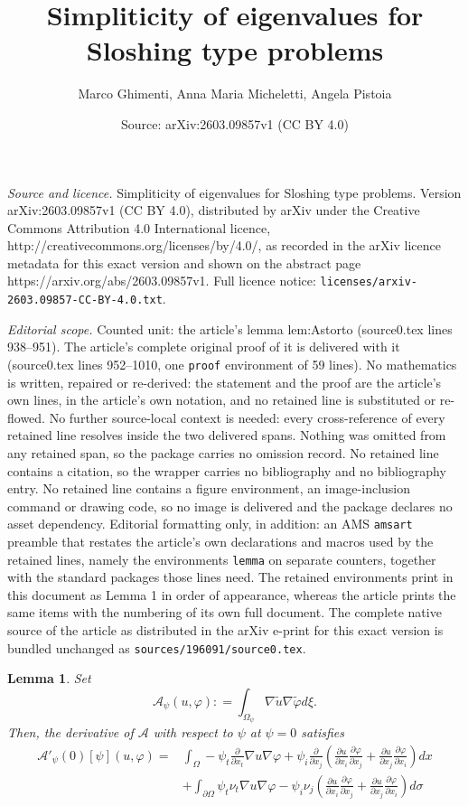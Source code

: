 \documentclass[10pt,a4paper]{amsart}
\title{Simpliticity of eigenvalues for Sloshing type problems}
\author{Marco Ghimenti, Anna Maria Micheletti, Angela Pistoia}
\date{Source: arXiv:2603.09857v1 (CC BY 4.0)}
\newtheorem{lemma}{Lemma}
\begin{document}
\maketitle

\noindent\emph{Source and licence.} Simpliticity of eigenvalues for Sloshing type problems. Version arXiv:2603.09857v1 (CC BY 4.0), distributed by arXiv under the Creative Commons Attribution 4.0 International licence, http://creativecommons.org/licenses/by/4.0/, as recorded in the arXiv licence metadata for this exact version and shown on the abstract page https://arxiv.org/abs/2603.09857v1. Full licence notice: \texttt{licenses/arxiv-2603.09857-CC-BY-4.0.txt}.\par\smallskip

\noindent\textit{Editorial scope.} Counted unit: the article's lemma lem:Astorto (source0.tex lines 938--951). The article's complete original proof of it is delivered with it (source0.tex lines 952--1010, one \texttt{proof} environment of 59 lines). No mathematics is written, repaired or re-derived: the statement and the proof are the article's own lines, in the article's own notation, and no retained line is substituted or re-flowed.  No further source-local context is needed: every cross-reference of every retained line resolves inside the two delivered spans.  Nothing was omitted from any retained span, so the package carries no omission record.  No retained line contains a citation, so the wrapper carries no bibliography and no bibliography entry.  No retained line contains a figure environment, an image-inclusion command or drawing code, so no image is delivered and the package declares no asset dependency.  Editorial formatting only, in addition: an AMS \texttt{amsart} preamble that restates the article's own declarations and macros used by the retained lines, namely the environments \texttt{lemma} on separate counters, together with the standard packages those lines need.  The retained environments print in this document as Lemma 1 in order of appearance, whereas the article prints the same items with the numbering of its own full document.  The complete native source of the article as distributed in the arXiv e-print for this exact version is bundled unchanged as \texttt{sources/196091/source0.tex}.
\begin{lemma}\label{lem:Astorto} Set $$
\mathcal{A}_\psi(u,\varphi):
=\int_{\Omega_\psi} \nabla \tilde u\nabla \tilde \varphi d\xi.$$ 
Then, the derivative of $\mathcal{A}$ with respect to $\psi$ at $\psi=0$ satisfies
\begin{eqnarray*}
    \mathcal{A}'_\psi(0)[\psi](u,\varphi)=
&\int_\Omega-\psi_t \frac{\partial}{\partial x_t} \nabla u\nabla \varphi + \psi_i\frac{\partial }{ \partial x_j}\left(\frac{\partial u}{\partial x_i}\frac{\partial \varphi}{\partial x_j}+
\frac{\partial u}{\partial x_j}\frac{\partial \varphi}{\partial x_i}
\right) dx\\
&+\int_{\partial\Omega}\psi_t \nu_t \nabla u\nabla \varphi -
\psi_i \nu_j\left(\frac{\partial u}{\partial x_i}\frac{\partial \varphi}{\partial x_j}+\frac{\partial u}{\partial x_j}\frac{\partial \varphi}{\partial x_i}
\right) d\sigma
\end{eqnarray*} 
\end{lemma}
\end{document}
